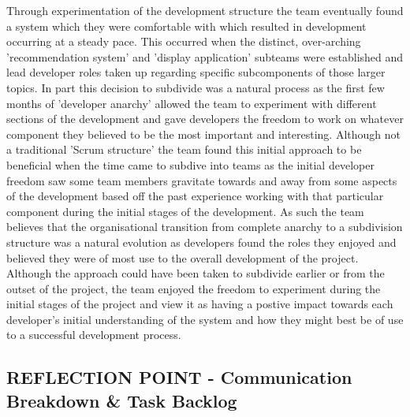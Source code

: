 \documentclass{l3proj}
\begin{document}
Through experimentation of the development structure the team eventually found a system which they were comfortable with which resulted in development occurring at a steady pace. This occurred when the distinct, over-arching 'recommendation system' and 'display application' subteams were established and lead developer roles taken up regarding specific subcomponents of those larger topics. In part this decision to subdivide was a natural process as the first few months of 'developer anarchy' allowed the team to experiment with different sections of the development and gave developers the freedom to work on whatever component they believed to be the most important and interesting. Although not a traditional 'Scrum structure' the team found this initial approach to be beneficial when the time came to subdive into teams as the initial developer freedom saw some team members gravitate towards and away from some aspects of the development based off the past experience working with that particular component during the initial stages of the development. As such the team believes that the organisational transition from complete anarchy to a subdivision structure was a natural evolution as developers found the roles they enjoyed and believed they were of most use to the overall development of the project. Although the approach could have been taken to subdivide earlier or from the outset of the project, the team enjoyed the freedom to experiment during the initial stages of the project and view it as having a postive impact towards each developer's initial understanding of the system and how they might best be of use to a successful development process.
    

\subsection{REFLECTION POINT - Communication Breakdown \& Task Backlog}
\label{sec:communicationbreakdown}

\end{document}
